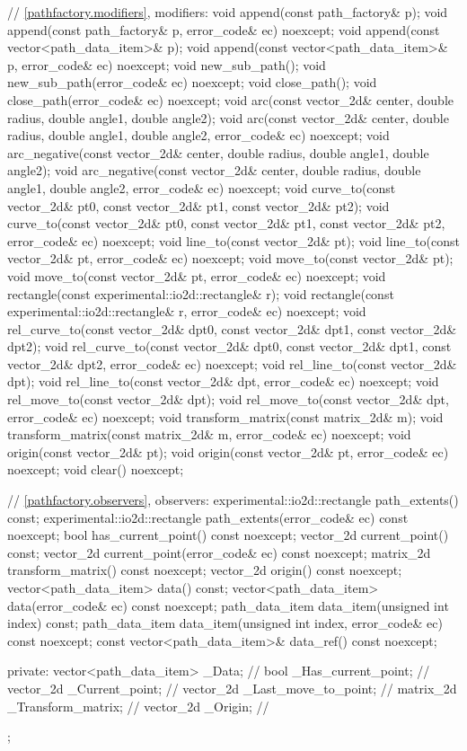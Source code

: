 \begin{codeblock}
{{{{{    // \ref{pathfactory.modifiers}, modifiers:
    void append(const path_factory& p);
    void append(const path_factory& p, error_code& ec) noexcept;
    void append(const vector<path_data_item>& p);
    void append(const vector<path_data_item>& p, error_code& ec) noexcept;
    void new_sub_path();
    void new_sub_path(error_code& ec) noexcept;
    void close_path();
    void close_path(error_code& ec) noexcept;
    void arc(const vector_2d& center, double radius, double angle1,
      double angle2);
    void arc(const vector_2d& center, double radius, double angle1,
      double angle2, error_code& ec) noexcept;
    void arc_negative(const vector_2d& center, double radius, double angle1,
      double angle2);
    void arc_negative(const vector_2d& center, double radius, double angle1,
      double angle2, error_code& ec) noexcept;
    void curve_to(const vector_2d& pt0, const vector_2d& pt1,
      const vector_2d& pt2);
    void curve_to(const vector_2d& pt0, const vector_2d& pt1,
      const vector_2d& pt2, error_code& ec) noexcept;
    void line_to(const vector_2d& pt);
    void line_to(const vector_2d& pt, error_code& ec) noexcept;
    void move_to(const vector_2d& pt);
    void move_to(const vector_2d& pt, error_code& ec) noexcept;
    void rectangle(const experimental::io2d::rectangle& r);
    void rectangle(const experimental::io2d::rectangle& r,
      error_code& ec) noexcept;
    void rel_curve_to(const vector_2d& dpt0, const vector_2d& dpt1,
      const vector_2d& dpt2);
    void rel_curve_to(const vector_2d& dpt0, const vector_2d& dpt1,
      const vector_2d& dpt2, error_code& ec) noexcept;
    void rel_line_to(const vector_2d& dpt);
    void rel_line_to(const vector_2d& dpt, error_code& ec) noexcept;
    void rel_move_to(const vector_2d& dpt);
    void rel_move_to(const vector_2d& dpt, error_code& ec) noexcept;
    void transform_matrix(const matrix_2d& m);
    void transform_matrix(const matrix_2d& m, error_code& ec) noexcept;
    void origin(const vector_2d& pt);
    void origin(const vector_2d& pt, error_code& ec) noexcept;
    void clear() noexcept;
    
    // \ref{pathfactory.observers}, observers:
    experimental::io2d::rectangle path_extents() const;
    experimental::io2d::rectangle path_extents(error_code& ec) const noexcept;
    bool has_current_point() const noexcept;
    vector_2d current_point() const;
    vector_2d current_point(error_code& ec) const noexcept;
    matrix_2d transform_matrix() const noexcept;
    vector_2d origin() const noexcept;
    vector<path_data_item> data() const;
    vector<path_data_item> data(error_code& ec) const noexcept;
    path_data_item data_item(unsigned int index) const;
    path_data_item data_item(unsigned int index, error_code& ec) const noexcept;
    const vector<path_data_item>& data_ref() const noexcept;

  private:
    vector<path_data_item> _Data;  // \expos
    bool _Has_current_point;       // \expos
    vector_2d _Current_point;      // \expos
    vector_2d _Last_move_to_point; // \expos
    matrix_2d _Transform_matrix;   // \expos
    vector_2d _Origin;             // \expos
  };
} } } }
\end{codeblock}

